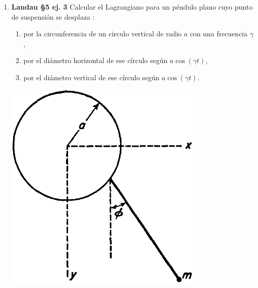 \documentclass[11pt,spanish,a4paper]{article}
\begin{document}
\begin{enumerate}
\item \begin{minipage}[t][4.5cm]{0.7\textwidth}
\textbf{Landau \S5 ej. 3}
Calcular el Lagrangiano para un péndulo plano cuyo punto de suspensión se desplaza :
\begin{enumerate}
\item por la circunferencia de un circulo vertical de radio \(a\) con una frecuencia \(\gamma\),
\item por el diámetro horizontal de ese círculo según \(a \cos{(\gamma t)}\),
\item por el diámetro vertical de ese círculo según \(a \cos{(\gamma t)}\).
\end{enumerate}
\end{minipage}
	\begin{minipage}[c][2.5cm][t]{0.3\textwidth}
	\includegraphics[width=0.75\textwidth]{landauS52_fig3.png}
\end{minipage}




\end{enumerate}
\end{document}
